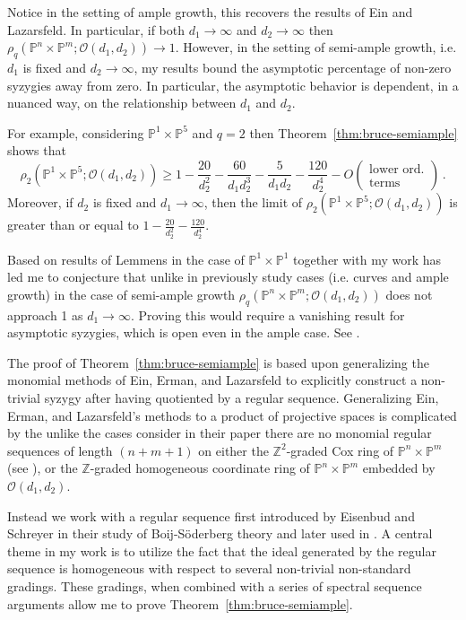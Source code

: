 \documentclass[10pt,reqno]{amsart}
\theoremstyle{remark}
\renewcommand{\O}{\mathcal{O}}
\renewcommand{\P}{\mathbb{P}}
\newcommand{\Z}{\mathbb{Z}}
\begin{document}
Notice in the setting of ample growth, this recovers the results of Ein and Lazarsfeld. In particular, if both $d_{1}\to \infty$ and $d_{2}\to\infty$ then $\rho_{q}\left(\P^{n}\times\P^{m}; \O(d_1,d_2)\right)\to 1$. However, in the setting of semi-ample growth, i.e. $d_{1}$ is fixed and $d_{2}\to \infty$, my results bound the asymptotic percentage of non-zero syzygies away from zero. In particular, the asymptotic behavior is dependent, in a nuanced way, on the relationship between $d_{1}$ and $d_{2}$. 

For example, considering $\P^{1}\times\P^{5}$ and $q=2$ then Theorem~\ref{thm:bruce-semiample} shows that 
\[
\rho_{2}\left(\P^{1}\times\P^{5}; \O(d_1,d_2)\right)\geq1-\frac{20}{d_2^2}-\frac{60}{d_1d_2^3}-\frac{5}{d_1d_2}-\frac{120}{d_2^4}-O\left(\begin{matrix}\text{lower ord.}\\ \text{terms}\end{matrix}\right)\,.
\]
Moreover, if $d_2$ is fixed and $d_1\to\infty$, then the limit of $\rho_{2}\left(\P^{1}\times\P^{5}; \O(d_1,d_2)\right)$ is greater than or equal to $1-\frac{20}{d^2_2}-\frac{120}{d_2^4}$.

Based on results of Lemmens in the case of $\P^1\times\P^1$ together with my work has led me to conjecture that unlike in previously study cases (i.e. curves and ample growth) in the case of semi-ample growth $\rho_{q}\left(\P^{n}\times\P^{m}; \O(d_1,d_2)\right)$ does not approach 1 as $d_{1}\to \infty$. Proving this would require a vanishing result for asymptotic syzygies, which is open even in the ample case. See \cite[Conjecture~7.1, Conjecture~7.5]{einLazarsfeld12}.

The proof of Theorem~\ref{thm:bruce-semiample} is based upon generalizing the monomial methods of Ein, Erman, and Lazarsfeld to explicitly construct a non-trivial syzygy after having quotiented by a regular sequence. Generalizing Ein, Erman, and Lazarsfeld's methods to a product of projective spaces is complicated by the unlike the cases consider in their paper there are no monomial regular sequences of length $(n+m+1)$ on either the $\Z^2$-graded Cox ring of $\P^{n}\times\P^{m}$ (see \cite{cox95}), or the $\Z$-graded homogeneous coordinate ring of $\P^{n}\times\P^{m}$ embedded by $\O(d_{1},d_{2})$.

Instead we work with a regular sequence first introduced by Eisenbud and Schreyer in their study of Boij-S\"{o}derberg theory \cite{eisenbudSchreyer09} and later used in \cite{berkesch13, oeding17}. A central theme in my work is to utilize the fact that the ideal generated by the regular sequence is homogeneous with respect to several non-trivial non-standard gradings. These gradings, when combined with a series of spectral sequence arguments allow me to prove Theorem~\ref{thm:bruce-semiample}.
\end{document}
